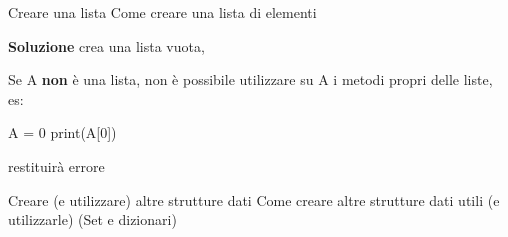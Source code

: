\documentclass[10pt]{extarticle}
\makeatletter
\newcommand{\<}{\langle}
\renewcommand{\>}{\rangle}
\renewenvironment{proof}[1][\proofname] {\par\pushQED{\qed}
\renewcommand*{\proofname}{Soluzione}
{\normalfont\sffamily\bfseries\topsep6\p@\@plus6\p@\relax #1\@addpunct{.} }}{\popQED\endtrivlist\@endpefalse}
\theoremstyle{mystyle}{\newtheorem*{remark}{Nota}}
\theoremstyle{mystyle}{\newtheorem*{remarks}{Note}}
\theoremstyle{mystyle}{\newtheorem*{example}{Esempio}}
\theoremstyle{mystyle}{\newtheorem*{examples}{Esempi}}
\theoremstyle{definition}{\newtheorem*{exercise}{Exercise}}
\theoremstyle{warn}
\makeatother
\begin{document}
\begin{definition}{Creare una lista}{}
Come creare una lista di elementi
\end{definition}
\begin{proof}
 crea una lista vuota, 
\end{proof}

\begin{remark}
Se A \textbf{non} è una lista, non è possibile utilizzare su A i metodi propri delle liste, es:
\begin{python}
A = 0
print(A[0])
\end{python}
restituirà errore
\end{remark}

\begin{definition}{Creare (e utilizzare) altre strutture dati}{}
Come creare altre strutture dati utili (e utilizzarle) (Set e dizionari)
\end{definition}
\end{document}

